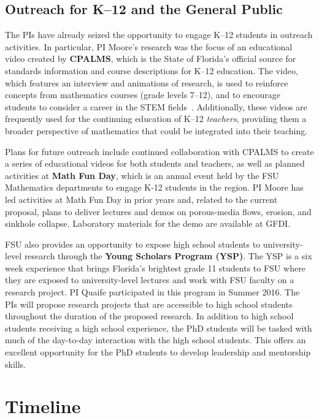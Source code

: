 \documentclass[11pt]{article}
\begin{document}
\subsection{Outreach for K--12 and the General Public}
The PIs have already seized the opportunity to engage K--12 students in outreach activities. In particular, PI Moore's research was the focus of an educational video created by {\bf CPALMS}, which is the State of Florida's official source for standards information and course descriptions for K--12 education. The video, which features an interview and animations of research, is used to reinforce concepts from mathematics courses (grade levels 7--12), and to encourage students to consider a career in the STEM fields~\cite{CPALMS}. Additionally, these videos are frequently used for the continuing education of K--12 {\em teachers}, providing them a broader perspective of mathematics that could be integrated into their teaching.
 
Plans for future outreach include continued collaboration with CPALMS to create a series of educational videos for both students and teachers, as well as planned activities at {\bf Math Fun Day}, which is an annual event held by the FSU Mathematics departments to engage K-12 students in the region. PI Moore has led activities at Math Fun Day in prior years and, related to the current proposal, plans to deliver lectures and demos on porous-media flows, erosion, and sinkhole collapse. Laboratory materials for the demo are available at GFDI.

FSU also provides an opportunity to expose high school students to university-level research through the {\bf Young Scholars Program (YSP)}. The YSP is a six week experience that brings Florida's brightest grade 11 students to FSU where they are exposed to university-level lectures and work with FSU faculty on a research project. PI Quaife participated in this program in Summer 2016. The PIs will propose research projects that are accessible to high school students throughout the duration of the proposed research. In addition to high school students receiving a high school experience, the PhD students will be tasked with much of the day-to-day interaction with the high school students. This offers an excellent opportunity for the PhD students to develop leadership and mentorship skills.

\section{Timeline}




\newpage
\setcounter{page}{1}

%

\end{document}
